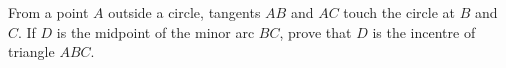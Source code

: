From a point $A$ outside a circle, tangents $AB$ and $AC$ touch the circle at $B$ and $C$. If $D$ is the midpoint of the minor arc $BC$, prove that $D$ is the incentre of triangle $ABC$.
